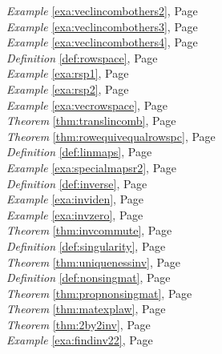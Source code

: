 \begin{multicols}{3}
\begin{center}
      \textit{Example} \ref{exa:veclincombothers2}, Page \pageref{exa:veclincombothers2} \\
      \textit{Example} \ref{exa:veclincombothers3}, Page \pageref{exa:veclincombothers3} \\
      \textit{Example} \ref{exa:veclincombothers4}, Page \pageref{exa:veclincombothers4} \\
      \textit{Definition} \ref{def:rowspace}, Page \pageref{def:rowspace} \\
      \textit{Example} \ref{exa:rsp1}, Page \pageref{exa:rsp1} \\
      \textit{Example} \ref{exa:rsp2}, Page \pageref{exa:rsp2} \\
      \textit{Example} \ref{exa:vecrowspace}, Page \pageref{exa:vecrowspace} \\
      \textit{Theorem} \ref{thm:translincomb}, Page \pageref{thm:translincomb} \\
      \textit{Theorem} \ref{thm:rowequivequalrowspc}, Page \pageref{thm:rowequivequalrowspc} \\
      \textit{Definition} \ref{def:linmaps}, Page \pageref{def:linmaps} \\
      \textit{Example} \ref{exa:specialmapsr2}, Page \pageref{exa:specialmapsr2} \\
      \textit{Definition} \ref{def:inverse}, Page \pageref{def:inverse} \\
      \textit{Example} \ref{exa:inviden}, Page \pageref{exa:inviden} \\
      \textit{Example} \ref{exa:invzero}, Page \pageref{exa:invzero} \\
      \textit{Theorem} \ref{thm:invcommute}, Page \pageref{thm:invcommute} \\
      \textit{Definition} \ref{def:singularity}, Page \pageref{def:singularity} \\
      \textit{Theorem} \ref{thm:uniquenessinv}, Page \pageref{thm:uniquenessinv} \\
      \textit{Definition} \ref{def:nonsingmat}, Page \pageref{def:nonsingmat} \\
      \textit{Theorem} \ref{thm:propnonsingmat}, Page \pageref{thm:propnonsingmat} \\
      \textit{Theorem} \ref{thm:matexplaw}, Page \pageref{thm:matexplaw} \\
      \textit{Theorem} \ref{thm:2by2inv}, Page \pageref{thm:2by2inv} \\
      \textit{Example} \ref{exa:findinv22}, Page \pageref{exa:findinv22} \\

\end{center}
\end{multicols}
